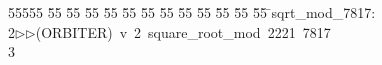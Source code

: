 %
%
\begin{tabbing}
55555 \= 55 \= 55 \= 55 \= 55 \= 55 \= 55 \= 55 \= 55 \= 55 \= 55 \= 55 \= 55 \= \>sqrt\_mod\_7817:\\[0pt]
2\>$\triangleright$\>$\triangleright$\>(ORBITER)\ v\ 2\ square\_root\_mod\ 2221\ 7817\\[0pt]
3\>\end{tabbing}
